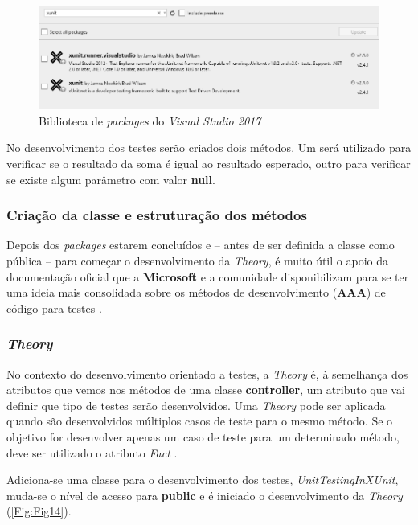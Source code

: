 \begin{figure}[hbt!]
\centering
\includegraphics[width=0.7\linewidth]{Cap5/XUnitDependencies.png}
\caption{Biblioteca de \textit{packages} do \textit{Visual Studio 2017}}
\label{Fig:Fig13}
\end{figure}

\hspace{1cm}No desenvolvimento dos testes serão criados dois métodos. Um será utilizado para verificar se o resultado da soma é igual ao resultado esperado, outro para verificar se existe algum parâmetro com valor \textbf{null}.

\subsubsection{Criação da classe e estruturação dos métodos}

\hspace{1cm}Depois dos \textit{packages} estarem concluídos e -- antes de ser definida a classe como pública -- para começar o desenvolvimento da \textit{Theory}, é muito útil o apoio da documentação oficial que a \textbf{Microsoft} e a comunidade disponibilizam para se ter uma ideia mais consolidada sobre os métodos de desenvolvimento (\textbf{AAA}) de código para testes \cite{unittestingfundamentals}.
 
\subsubsection{\textit{Theory}}

\hspace{1cm}No contexto do desenvolvimento orientado a testes, a \textit{Theory} é, à semelhança dos atributos que vemos nos métodos de uma classe \textbf{controller}, um atributo que vai definir que tipo de testes serão desenvolvidos. Uma \textit{Theory} pode ser aplicada quando são desenvolvidos múltiplos casos de teste para o mesmo método. Se o objetivo for desenvolver apenas um caso de teste para um determinado método, deve ser utilizado o atributo \textit{Fact} \cite{unittestingxunit}.

\hspace{1cm}Adiciona-se uma classe para o desenvolvimento dos testes, \textit{UnitTestingInXUnit}, muda-se o nível de acesso para \textbf{public} e é iniciado o desenvolvimento da \textit{Theory} (\ref{Fig:Fig14}).


